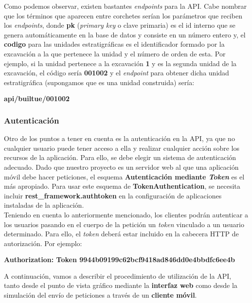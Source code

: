 Como podemos observar, existen bastantes \textit{endpoints} para la API. Cabe nombrar que
los términos que aparecen entre corchetes serían los parámetros que reciben los
\textit{endpoints}, donde \textbf{pk} (\textit{primary key} o clave primaria) es el id
interno que se genera automáticamente en la base de datos y consiste en un número entero y,
el \textbf{codigo} para las unidades estratigráficas es el identificador formado por la
excavación a la que pertenece la unidad y el número de orden de esta. Por ejemplo, si
la unidad pertenece a la excavación \textbf{1} y es la segunda unidad de la excavación, el
código sería \textbf{001002} y el \textit{endpoint} para obtener dicha unidad estratigráfica
(supongamos que es una unidad construida) sería:

            \begin{center} \textbf{api/builtue/001002} \end{center}

\newpage \subsubsection{Autenticación}
Otro de los puntos a tener en cuenta es la autenticación en la API, ya que no cualquier
usuario puede tener acceso a ella y realizar cualquier acción sobre los recursos de la
aplicación. Para ello, se debe elegir un sistema de autenticación adecuado. Dado que
nuestro proyecto es un servidor web al que una aplicación móvil debe hacer peticiones,
el esquema \textbf{Autenticación mediante \textit{Token}} es el más apropiado. Para usar
este esquema de \textbf{TokenAuthentication}, se necesita incluir
\textbf{rest\_framework.authtoken} en la configuración de aplicaciones instaladas de la
aplicación.\\

Teniendo en cuenta lo anteriormente mencionado, los clientes podrán autenticar a los usuarios
pasando en el cuerpo de la petición un \textit{token} vinculado a un usuario determinado.
Para ello, el \textit{token} deberá estar incluido en la cabecera HTTP de autorización. Por
ejemplo:

\begin{center}
    \textbf{Authorization: Token 9944b09199c62bcf9418ad846dd0e4bbdfc6ee4b}
\end{center}

A continuación, vamos a describir el procedimiento de utilización de la API, tanto desde el
punto de vista gráfico mediante la \textbf{interfaz web} como desde la simulación del envío
de peticiones a través de un \textbf{cliente móvil}.\\


